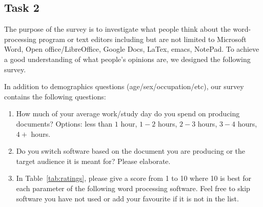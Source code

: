 \documentclass[a4paper,11pt]{article}
\begin{document}

\clearpage
\subsection*{Task 2}
The purpose of the survey is to investigate what people think about the word-processing program or text editors including but are not limited to Microsoft Word, Open office/LibreOffice, Google Docs,
LaTex, emacs, NotePad. To achieve a good understanding of what people's opinions are, we designed the following survey.


In addition to demographics questions (age/sex/occupation/etc), our survey contains the following questions:

\begin{enumerate}
    \item How much of your average work/study day do you spend on producing documents?
    Options: less than $1$ hour, $1-2$ hours, $2-3$ hours, $3-4$ hours, $4+$ hours.
    \item Do you switch software based on the document you are producing or the target audience it is meant for? Please elaborate.
    \item In Table~\ref{tab:ratings}, please give a score from 1 to 10 where 10 is best for each parameter of the following word processing software. Feel free to skip software you have not used or add your favourite if it is not in the list.
    \begin{table}[!h]
    \centering
    \caption{Ratings table.}
    \label{tab:ratings}
\end{table}
\end{enumerate}
\end{document}
